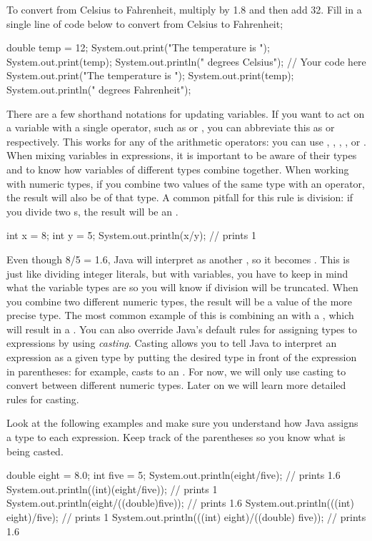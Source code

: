 \begin{exercise}	
  To convert from Celsius to Fahrenheit, multiply by 1.8 and then add 32. Fill in a single line of code below to convert  from Celsius to Fahrenheit;	
  \begin{code}	
    double temp = 12;	
    System.out.print("The temperature is ");	
    System.out.print(temp);	
    System.out.println(" degrees Celsius");	
    // Your code here	
    System.out.print("The temperature is ");	
    System.out.print(temp);	
    System.out.println(" degrees Fahrenheit");	
  \end{code}	
\end{exercise}	
There are a few shorthand notations for updating variables. If you want to act on a variable  with a single operator, such as  or , you can abbreviate this as  or  respectively. This works for any of the arithmetic operators: you can use \ic{+=}, \ic{-=}, \ic{*=}, \ic{/=}, or \ic{\%=}.	
When mixing variables in expressions, it is important to be aware of their types and to know how variables of different types combine together. When working with numeric types, if you combine two values of the same type with an operator, the result will also be of that type. A common pitfall for this rule is division: if you divide two s, the result will be an .	
\begin{code}	
  int x = 8;	
  int y = 5;	
  System.out.println(x/y); // prints 1	
\end{code}	
Even though 8/5 = 1.6, Java will interpret  as another , so it becomes . This is just like dividing integer literals, but with variables, you have to keep in mind what the variable types are so you will know if division will be truncated.	
When you combine two different numeric types, the result will be a value of the more precise type. The most common example of this is combining an  with a , which will result in a .	
You can also override Java's default rules for assigning types to expressions by using \emph{casting}. Casting allows you to tell Java to interpret an expression as a given type by putting the desired type in front of the expression in parentheses: for example,  casts  to an . For now, we will only use casting to convert between different numeric types. Later on we will learn more detailed rules for casting.	
\begin{example}	
  Look at the following examples and make sure you understand how Java assigns a type to each expression. Keep track of the parentheses so you know what is being casted.	
  \begin{code}	
    double eight = 8.0;	
    int five = 5;	
    System.out.println(eight/five); // prints 1.6	
    System.out.println((int)(eight/five)); // prints 1	
    System.out.println(eight/((double)five)); // prints 1.6	
    System.out.println(((int) eight)/five); // prints 1	
    System.out.println(((int) eight)/((double) five)); // prints 1.6	
  \end{code}	
\end{example}	

